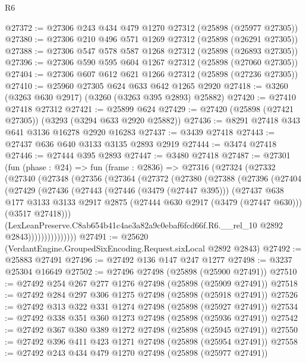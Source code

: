 \begin{lexlean}{R6}
\begin{coremodule}
@27372 := @27306 @243 @434 @479 @1270 @27312 (@25898 (@25977 @27305))
@27380 := @27306 @210 @496 @571 @1269 @27312 (@25898 (@26291 @27305))
@27388 := @27306 @547 @578 @587 @1268 @27312 (@25898 (@26893 @27305))
@27396 := @27306 @590 @595 @604 @1267 @27312 (@25898 (@27060 @27305))
@27404 := @27306 @607 @612 @621 @1266 @27312 (@25898 (@27236 @27305))
@27410 := @25960 @27305 @624 @633 @642 @1265 @2920
@27418 := @3260 (@3263 @630 @2917) (@3260 (@3263 @395 @2893) @25882)
@27420 := @27410 @27418 @27312
@27421 := @25899 @624
@27429 := @27420 (@25898 (@27421 @27305)) (@3293 (@3294 @633 @2920 @25882))
@27436 := @8291 @27418 @343 @641 @3136 @16278 @2920 @16283
@27437 := @3439 @27418
@27443 := @27437 @636 @640 @3133 @3135 @2893 @2919
@27444 := @3474 @27418
@27446 := @27444 @395 @2893
@27447 := @3480 @27418
@27487 := @27301
    (fun (phase : @24) =>
    fun (frame : @2836) =>
    @27316
      (@27324
        (@27332
          (@27340
            (@27348
              (@27356
                (@27364
                  (@27372
                    (@27380
                      (@27388
                        (@27396
                          (@27404
                            (@27429
                              (@27436
                                (@27443
                                  (@27446 (@3479 (@27447 @395)))
                                  (@27437
                                    @638
                                    @177
                                    @3133
                                    @3133
                                    @2917
                                    @2875
                                    (@27444 @630 @2917 (@3479 (@27447 @630)))
                                    (@3517 @27418)))
                                (LexLeanPreserve.C8ab654b41c4ae3a82a9c0ebaf6fcd66f.R6.__rel_10
                                  @2892
                                  @2843)))))))))))))))
@27491 := @25620 (VerdantEngine.GroupedSixEncoding.Request.sixLocal @2892 @2843)
@27492 := @25883 @27491
@27496 := @27492 @136 @147 @247 @1277
@27498 := @3237 @25304 @16649
@27502 := @27496 @27498 (@25898 (@25900 @27491))
@27510 := @27492 @254 @267 @277 @1276 @27498 (@25898 (@25909 @27491))
@27518 := @27492 @284 @297 @306 @1275 @27498 (@25898 (@25918 @27491))
@27526 := @27492 @313 @322 @331 @1274 @27498 (@25898 (@25927 @27491))
@27534 := @27492 @338 @351 @360 @1273 @27498 (@25898 (@25936 @27491))
@27542 := @27492 @367 @380 @389 @1272 @27498 (@25898 (@25945 @27491))
@27550 := @27492 @396 @411 @423 @1271 @27498 (@25898 (@25954 @27491))
@27558 := @27492 @243 @434 @479 @1270 @27498 (@25898 (@25977 @27491))

\end{coremodule}
\end{lexlean}
